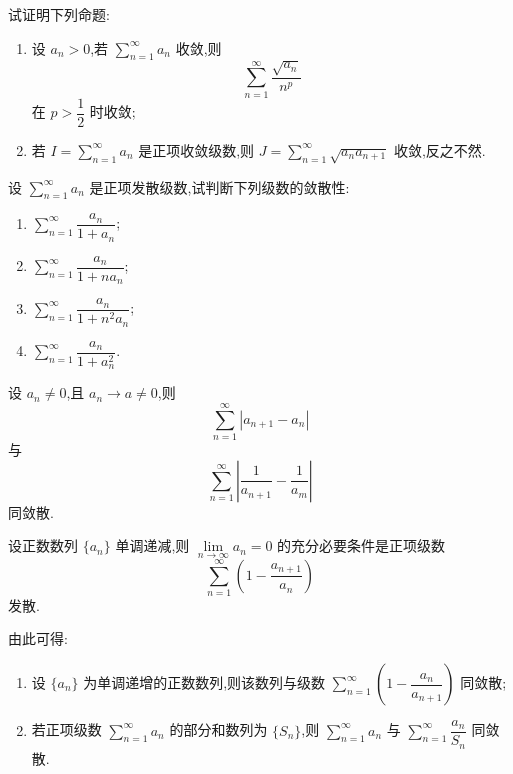 \documentclass[../../数学分析培优讲义.tex]{subfiles}
\begin{document}
\begin{example}
试证明下列命题:
\begin{enumerate}[label=(\arabic*)]
    \item 设 $a_n>0$,若 $\displaystyle\sum\limits_{n=1}^{\infty}a_n$ 收敛,则
    \[
        \sum\limits_{n=1}^{\infty}\dfrac{\sqrt{a_n}}{n^p}
    \]
    在 $p>\dfrac{1}{2}$ 时收敛;
    \item 若 $\displaystyle I=\sum\limits_{n=1}^{\infty}a_n$ 是正项收敛级数,则 $\displaystyle J=\sum\limits_{n=1}^{\infty}\sqrt{a_na_{n+1}}$ 收敛,反之不然.
\end{enumerate}
\end{example}
\exampleblank

\begin{example}
设 $\displaystyle\sum\limits_{n=1}^{\infty}a_n$ 是正项发散级数,试判断下列级数的敛散性:
\begin{enumerate}[label=(\arabic*)]
    \item $\displaystyle\sum\limits_{n=1}^{\infty}\dfrac{a_n}{1+a_n}$;
    \item $\displaystyle\sum\limits_{n=1}^{\infty}\dfrac{a_n}{1+na_n}$;
    \item $\displaystyle\sum\limits_{n=1}^{\infty}\dfrac{a_n}{1+n^2a_n}$;
    \item $\displaystyle\sum\limits_{n=1}^{\infty}\dfrac{a_n}{1+a_n^2}$.
\end{enumerate}
\end{example}
\exampleblank

\begin{example}
设 $a_n\neq0$,且 $a_n\to a\neq0$,则
\[
    \sum\limits_{n=1}^{\infty}|a_{n+1}-a_n|
\]
与
\[
    \sum\limits_{n=1}^{\infty}\left|\dfrac{1}{a_{n+1}}-\dfrac{1}{a_m}\right|
\]
同敛散.
\end{example}
\exampleblank

\begin{example}
设正数数列 $\{a_n\}$ 单调递减,则 $\displaystyle\lim\limits_{n\to\infty}a_n=0$ 的充分必要条件是正项级数
\[
    \sum\limits_{n=1}^{\infty}\left(1-\dfrac{a_{n+1}}{a_n}\right)
\]
发散.
\end{example}
\exampleblank

\begin{remark}
由此可得:
\begin{enumerate}[label=\textcircled{\arabic*}]
    \item 设 $\{a_n\}$ 为单调递增的正数数列,则该数列与级数 $\displaystyle\sum\limits_{n=1}^{\infty}\left(1-\dfrac{a_n}{a_{n+1}}\right)$ 同敛散;
    \item 若正项级数 $\displaystyle\sum\limits_{n=1}^{\infty}a_n$ 的部分和数列为 $\{S_n\}$,则 $\displaystyle\sum\limits_{n=1}^{\infty}a_n$ 与 $\displaystyle\sum\limits_{n=1}^{\infty}\dfrac{a_n}{S_n}$ 同敛散.
\end{enumerate}
\end{remark}
\end{document}
